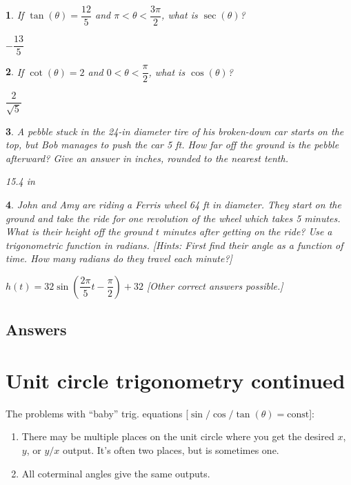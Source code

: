 \documentclass{amsbook}
\newtheorem{exc}{}
\newenvironment{ex}{\begin{exc}\normalfont}{\end{exc}}
\numberwithin{section}{chapter}
\numberwithin{equation}{chapter}
\begin{document}
\begin{ex}
	If $\tan(\theta) = \dfrac{12}{5}$ and $\pi < \theta < \dfrac{3\pi}{2}$, what is $\sec(\theta)$?
	\begin{sol}
		$-\dfrac{13}{5}$
	\end{sol}
\end{ex}


\begin{ex}
	If $\cot(\theta) = 2$ and $0 < \theta < \dfrac{\pi}{2}$, what is $\cos(\theta)$?
	\begin{sol}
		$\dfrac{2}{\sqrt{5}}$
	\end{sol}
\end{ex}

\begin{ex}
	A pebble stuck in the 24-in diameter tire of his broken-down car starts on the top, but Bob manages to push the car 5 ft. How far off the ground is the pebble afterward? Give an answer in inches, rounded to the nearest tenth.
	\begin{sol}
		15.4 in
	\end{sol}
\end{ex}

\begin{ex}\label{ferriswheel}
	John and Amy are riding a Ferris wheel 64 ft in diameter. They start on the ground and take the ride for one revolution of the wheel which takes 5 minutes. What is their height off the ground $t$ minutes after getting on the ride? Use a trigonometric function in radians. [Hints: First find their angle as a function of time. How many radians do they travel each minute?]
	\begin{sol}
		$h(t) = 32\sin\left( \dfrac{2\pi}{5}t - \dfrac{\pi}{2} \right) + 32$ [Other correct answers possible.]
	\end{sol}
\end{ex}


\subsection*{Answers \nopunct} \hfill
\begin{multicols}{2}
	
\end{multicols}


\newpage
\section{Unit circle trigonometry continued}

The problems with ``baby'' trig. equations [$\sin/\cos/\tan(\theta) = \text{const}$]:
\begin{enumerate}
	\item There may be multiple places on the unit circle where you get the desired $x$, $y$, or $y/x$ output. It's often two places, but is sometimes one.
	\item All coterminal angles give the same outputs.
\end{enumerate}
\end{document}
